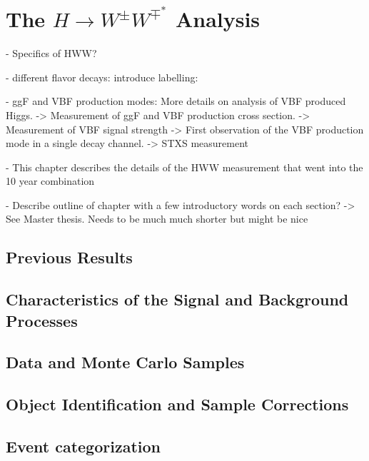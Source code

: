 \chapter{The $H\rightarrow W^{\pm}W^{\mp^*}$ Analysis}
\label{chap:hww}

- Specifics of HWW?

- different flavor decays: introduce labelling: \HWWdet 

- ggF and VBF production modes: More details on analysis of VBF produced Higgs. 
    -> Measurement of ggF and VBF production cross section.
    -> Measurement of VBF signal strength -> First observation of the VBF production mode in a single decay channel. 
    -> STXS measurement

- This chapter describes the details of the HWW measurement that went into the 10 year combination

- Describe outline of chapter with a few introductory words on each section?
    -> See Master thesis. Needs to be much much shorter but might be nice



\section{Previous Results}
\label{sec:prev-results}



\section{Characteristics of the Signal and Background Processes}
\label{sec:signal-bkg-characteristics}



\section{Data and Monte Carlo Samples}
\label{sec:data-mc-samples}



\section{Object Identification and Sample Corrections}
\label{sec:object-selection}



\section{Event categorization}
\label{sec:event-categorization}



